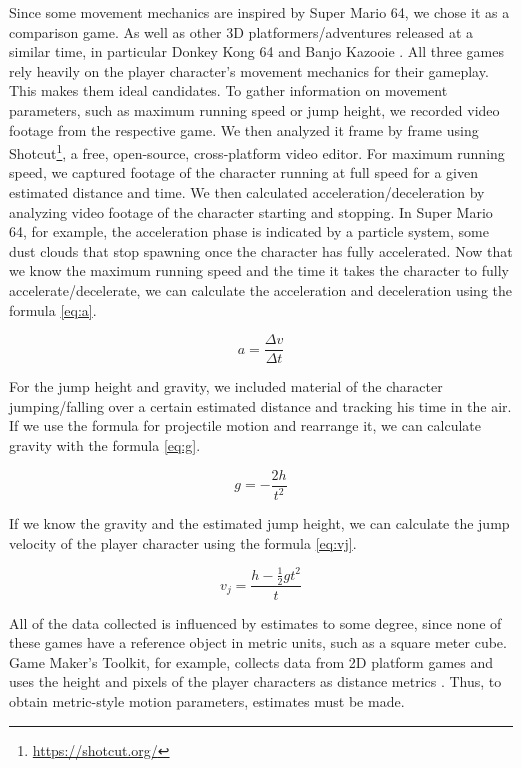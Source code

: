\documentclass[letterpaper, 10 pt, conference]{ieeeconf}  %
\begin{document}
Since some movement mechanics are inspired by Super Mario 64, we chose it as a comparison game.
As well as other 3D platformers/adventures released at a similar time,
in particular Donkey Kong 64 \cite{DonkeyKong64} and Banjo Kazooie \cite{BanjoKazooie}.
All three games rely heavily on the player character's movement mechanics for their gameplay.
This makes them ideal candidates.
To gather information on movement parameters, such as maximum running speed or jump height, we recorded video footage from the respective game.
We then analyzed it frame by frame using Shotcut\footnote{\url{https://shotcut.org/}}, a free, open-source, cross-platform video editor. 
For maximum running speed, we captured footage of the character running at full speed for a given estimated distance and time.
We then calculated acceleration/deceleration by analyzing video footage of the character starting and stopping.
In Super Mario 64, for example, the acceleration phase is indicated by a particle system, some dust clouds that stop spawning once the character has fully accelerated.
Now that we know the maximum running speed and the time it takes the character to fully accelerate/decelerate, we can calculate the acceleration and deceleration using the formula \ref{eq:a}.

\begin{equation}
    a = \frac{\Delta v}{\Delta t}
    \label{eq:a}
\end{equation}

For the jump height and gravity, we included material of the character jumping/falling over a certain estimated distance and tracking his time in the air.
If we use the formula for projectile motion \cite{gdc} and rearrange it, we can calculate gravity with the formula \ref{eq:g}.

\begin{equation}
    g = -\frac{2h}{t^2}
    \label{eq:g}
\end{equation}

If we know the gravity and the estimated jump height, we can calculate the jump velocity of the player character using the formula \ref{eq:vj}.

\begin{equation}
    v_j = \frac{h - \frac{1}{2}gt^2}{t}
    \label{eq:vj}
\end{equation}

All of the data collected is influenced by estimates to some degree, since none of these games have a reference object in metric units, such as a square meter cube.
Game Maker's Toolkit, for example, collects data from 2D platform games and uses the height and pixels of the player characters as distance metrics \cite{gameMakerTool}.
Thus, to obtain metric-style motion parameters, estimates must be made.
\end{document}
